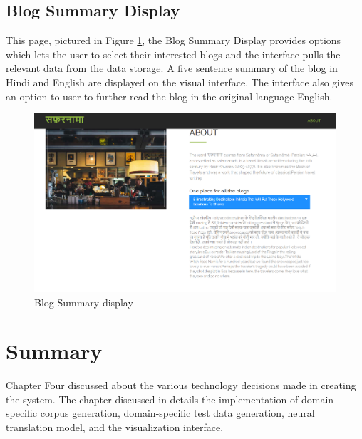 \subsection{Blog Summary Display}

This page, pictured in Figure \ref{display21}, the Blog Summary Display provides options which lets the user to select their interested blogs and the interface pulls the relevant data from the data storage. A five sentence summary of the blog in Hindi and English are displayed on the visual interface. The interface also gives an option to user to further read the blog in the original language English.

\begin{figure}[h]
\includegraphics[width=\textwidth]{figures/displaya2.png}
\caption{Blog Summary display} 
\label{display21}
\end{figure}
\section{Summary}
Chapter Four discussed about the various technology decisions made in creating the system. The chapter discussed in details the implementation of domain-specific corpus generation, domain-specific test data generation, neural translation model, and the visualization interface.
